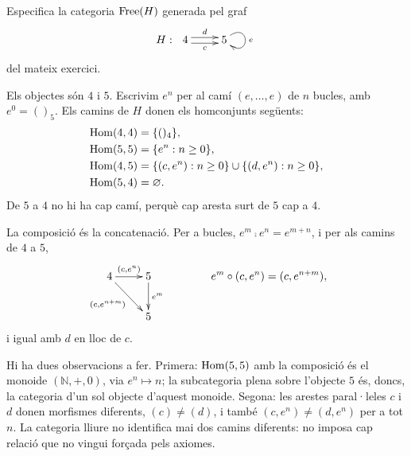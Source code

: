 \begin{exemple}\label{ex:grafs-free-bucle}
Especifica la categoria $\operatorname{Free}(H)$ generada pel graf
\[
H:\ 
\xymatrix{
    4 \ar@<0.6ex>[r]^{d} \ar@<-0.6ex>[r]_{c} & 5 \ar@(ur,dr)^{e}
}
\]
del mateix exercici.
\end{exemple}
\begin{solucio}
Els objectes són $4$ i $5$. Escrivim $e^n$ per al camí $(e,\dots,e)$ de $n$ bucles, amb $e^0=()_5$. Els camins de $H$ donen els homconjunts següents:
\[
\begin{aligned}
\operatorname{Hom}(4,4)&=\{()_4\},\\
\operatorname{Hom}(5,5)&=\{e^n : n\geq 0\},\\
\operatorname{Hom}(4,5)&=\{(c,e^n) : n\geq 0\}\cup\{(d,e^n) : n\geq 0\},\\
\operatorname{Hom}(5,4)&=\varnothing.
\end{aligned}
\]
De $5$ a $4$ no hi ha cap camí, perquè cap aresta surt de $5$ cap a $4$.

La composició és la concatenació. Per a bucles, $e^m\comp e^n=e^{m+n}$, i per als camins de $4$ a $5$,
\[
\xymatrix{
4 \ar[r]^-{(c,e^n)} \ar[dr]_-{(c,e^{n+m})} & 5 \ar[d]^-{e^m} \\
& 5
}
\qquad\qquad
e^m\comp(c,e^n)=(c,e^{n+m}),
\]
i igual amb $d$ en lloc de $c$.

Hi ha dues observacions a fer. Primera: $\operatorname{Hom}(5,5)$ amb la composició és el monoide $(\mathbb N,+,0)$, via $e^n\mapsto n$; la subcategoria plena sobre l'objecte $5$ és, doncs, la categoria d'un sol objecte d'aquest monoide. Segona: les arestes paral·leles $c$ i $d$ donen morfismes diferents, $(c)\neq(d)$, i també $(c,e^n)\neq(d,e^n)$ per a tot $n$. La categoria lliure no identifica mai dos camins diferents: no imposa cap relació que no vingui forçada pels axiomes.
\end{solucio}
